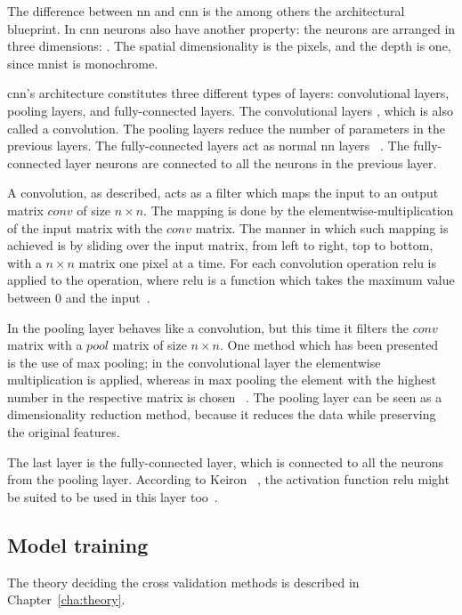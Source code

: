The difference between \gls{nn} and \gls{cnn} is the among others the architectural blueprint. In \gls{cnn} neurons also have another property: the neurons are arranged in three dimensions: . The spatial dimensionality is the pixels, and the depth is one, since \gls{mnist} is monochrome.


\gls{cnn}'s architecture constitutes three different types of layers: convolutional layers, pooling layers, and fully-connected layers. The convolutional layers , which is also called a convolution. The pooling layers reduce the number of parameters in the previous layers. The fully-connected layers act as normal \gls{nn} layers ~\cite{introduction-to-cnn}. The fully-connected layer neurons are connected to all the neurons in the previous layer.


A convolution, as described, acts as a filter which maps the input to an output matrix $conv$ of size $n \times n$. The mapping is done by the elementwise-multiplication of the input matrix with the $conv$ matrix. The manner in which such mapping is achieved is by sliding over the input matrix, from left to right, top to bottom, with a $n \times n$ matrix one pixel at a time. For each convolution operation \gls{relu} is applied to the operation, where \gls{relu} is a function which takes the maximum value between 0 and the input~\cite{google-cnn}.


In the pooling layer behaves like a convolution, but this time it filters the $conv$ matrix with a $pool$ matrix of size $n \times n$. One method which has been presented~\cite{google-cnn} is the use of max pooling; in the convolutional layer the elementwise multiplication is applied, whereas in max pooling the element with the highest number in the respective matrix is chosen ~\cite{google-cnn}. The pooling layer can be seen as a dimensionality reduction method, because it reduces the data while preserving the original features.


The last layer is the fully-connected layer, which is connected to all the neurons from the pooling layer. According to Keiron ~\cite{introduction-to-cnn}, the activation function \gls{relu} might be suited to be used in this layer too~\cite{lecun-mnist-database}.

\subsection{Model training}\label{subsec:model-training}
The theory deciding the cross validation methods is described in Chapter~\ref{cha:theory}.


